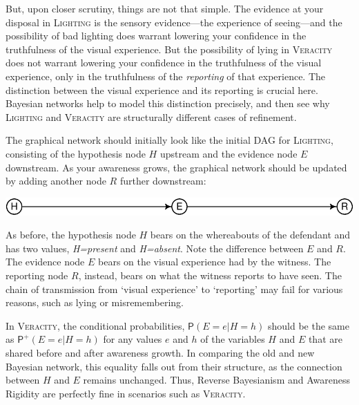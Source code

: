 \documentclass[
  11pt,
  dvipsnames,enabledeprecatedfontcommands]{scrartcl}
\newcommand{\pr}[1]{\ensuremath{\mathsf{P}(#1)}}
\newcommand{\ppr}[2]{\ensuremath{\mathsf{P}^{#1}(#2)}}
\begin{document}
But, upon closer scrutiny, things are not that simple. The evidence at
your disposal in \textsc{Lighting} is the sensory evidence---the
experience of seeing---and the possibility of bad lighting does warrant
lowering your confidence in the truthfulness of the visual experience.
But the possibility of lying in \textsc{Veracity} does not warrant
lowering your confidence in the truthfulness of the visual experience,
only in the truthfulness of the \textit{reporting} of that experience.
The distinction between the visual experience and its reporting is
crucial here. Bayesian networks help to model this distinction
precisely, and then see why \textsc{Lighting} and \textsc{Veracity} are
structurally different cases of refinement.

The graphical network should initially look like the initial DAG for
\textsc{Lighting}, consisting of the hypothesis node \(H\) upstream and
the evidence node \(E\) downstream. As your awareness grows, the
graphical network should be updated by adding another node \(R\) further
downstream:

\begin{center}\includegraphics[width=0.5\linewidth,height=0.3\textheight]{ReplyToSteeleStefansson4_files/figure-latex/veracityDAG-1} \end{center}

\noindent As before, the hypothesis node \(H\) bears on the whereabouts
of the defendant and has two values, \textit{H=present} and
\textit{H=absent}. Note the difference between \(E\) and \(R\). The
evidence node \(E\) bears on the visual experience had by the witness.
The reporting node \(R\), instead, bears on what the witness reports to
have seen. The chain of transmission from `visual experience' to
`reporting' may fail for various reasons, such as lying or
misremembering.

In \textsc{Veracity}, the conditional probabilities,
\(\pr{E=e \vert H=h}\) should be the same as \(\ppr{+}{E=e \vert H=h}\)
for any values \(e\) and \(h\) of the variables \(H\) and \(E\) that are
shared before and after awareness growth. In comparing the old and new
Bayesian network, this equality falls out from their structure, as the
connection between \(H\) and \(E\) remains unchanged. Thus, Reverse
Bayesianism and Awareness Rigidity are perfectly fine in scenarios such
as \textsc{Veracity}.
\end{document}
